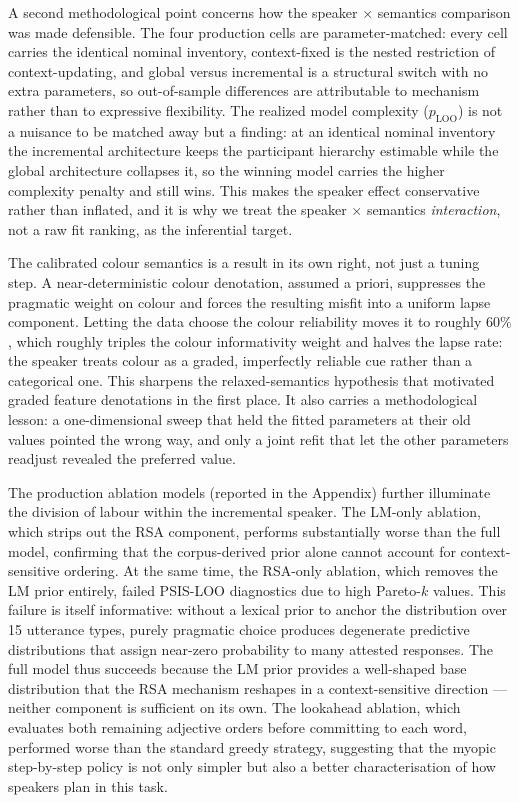 \documentclass[man,floatsintext]{apa7}
\begin{document}
A second methodological point concerns how the speaker $\times$ semantics comparison was made defensible.
The four production cells are parameter-matched: every cell carries the identical nominal inventory, context-fixed is the nested restriction of context-updating, and global versus incremental is a structural switch with no extra parameters, so out-of-sample differences are attributable to mechanism rather than to expressive flexibility.
The realized model complexity ($p_{\text{LOO}}$) is not a nuisance to be matched away but a finding: at an identical nominal inventory the incremental architecture keeps the participant hierarchy estimable while the global architecture collapses it, so the winning model carries the higher complexity penalty and still wins.
This makes the speaker effect conservative rather than inflated, and it is why we treat the speaker $\times$ semantics \emph{interaction}, not a raw fit ranking, as the inferential target.

The calibrated colour semantics is a result in its own right, not just a tuning step.
A near-deterministic colour denotation, assumed a priori, suppresses the pragmatic weight on colour and forces the resulting misfit into a uniform lapse component.
Letting the data choose the colour reliability moves it to roughly $60\%$, which roughly triples the colour informativity weight and halves the lapse rate: the speaker treats colour as a graded, imperfectly reliable cue rather than a categorical one.
This sharpens the relaxed-semantics hypothesis that motivated graded feature denotations in the first place.
It also carries a methodological lesson: a one-dimensional sweep that held the fitted parameters at their old values pointed the wrong way, and only a joint refit that let the other parameters readjust revealed the preferred value.

The production ablation models (reported in the Appendix) further illuminate the division of labour within the incremental speaker.
The LM-only ablation, which strips out the RSA component, performs substantially worse than the full model, confirming that the corpus-derived prior alone cannot account for context-sensitive ordering.
At the same time, the RSA-only ablation, which removes the LM prior entirely, failed PSIS-LOO diagnostics due to high Pareto-$k$ values.
This failure is itself informative: without a lexical prior to anchor the distribution over 15 utterance types, purely pragmatic choice produces degenerate predictive distributions that assign near-zero probability to many attested responses.
The full model thus succeeds because the LM prior provides a well-shaped base distribution that the RSA mechanism reshapes in a context-sensitive direction --- neither component is sufficient on its own.
The lookahead ablation, which evaluates both remaining adjective orders before committing to each word, performed worse than the standard greedy strategy, suggesting that the myopic step-by-step policy is not only simpler but also a better characterisation of how speakers plan in this task.
\end{document}
